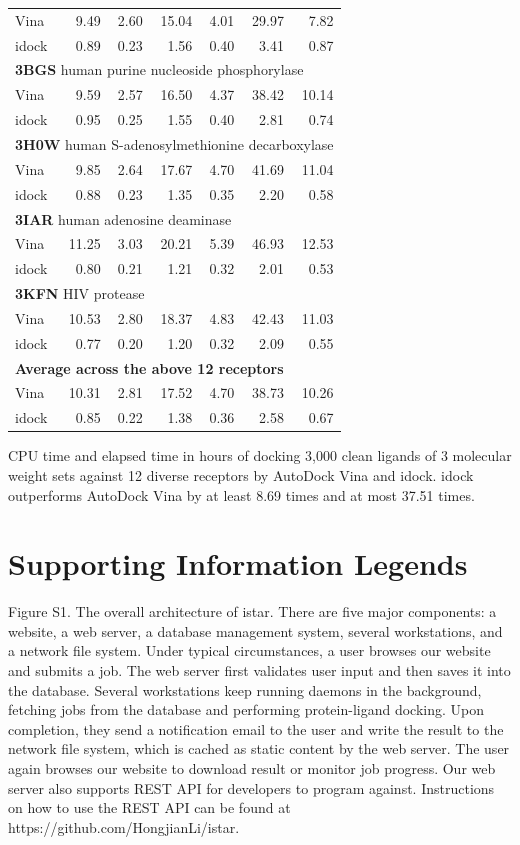 \documentclass[10pt]{article}
\begin{document}
\begin{table}[!ht]
\begin{tabular}{lrrrrrr}
Vina  &  9.49 &  2.60 & 15.04 &  4.01 & 29.97 &  7.82\\
idock &  0.89 &  0.23 &  1.56 &  0.40 &  3.41 &  0.87\\
\multicolumn{7}{l}{\textbf{3BGS} human purine nucleoside phosphorylase}\\
Vina  &  9.59 &  2.57 & 16.50 &  4.37 & 38.42 & 10.14\\
idock &  0.95 &  0.25 &  1.55 &  0.40 &  2.81 &  0.74\\
\multicolumn{7}{l}{\textbf{3H0W} human S-adenosylmethionine decarboxylase}\\
Vina  &  9.85 &  2.64 & 17.67 &  4.70 & 41.69 & 11.04\\
idock &  0.88 &  0.23 &  1.35 &  0.35 &  2.20 &  0.58\\
\multicolumn{7}{l}{\textbf{3IAR} human adenosine deaminase}\\
Vina  & 11.25 &  3.03 & 20.21 &  5.39 & 46.93 & 12.53\\
idock &  0.80 &  0.21 &  1.21 &  0.32 &  2.01 &  0.53\\
\multicolumn{7}{l}{\textbf{3KFN} HIV protease}\\
Vina  & 10.53 &  2.80 & 18.37 &  4.83 & 42.43 & 11.03\\
idock &  0.77 &  0.20 &  1.20 &  0.32 &  2.09 &  0.55\\
\multicolumn{7}{l}{\textbf{Average across the above 12 receptors}}\\
Vina  & 10.31 &  2.81 & 17.52 &  4.70 & 38.73 & 10.26\\
idock &  0.85 &  0.22 &  1.38 &  0.36 &  2.58 &  0.67\\
\end{tabular}
\begin{flushleft}\label{ExecutionTime} CPU time and elapsed time in hours of docking 3,000 clean ligands of 3 molecular weight sets against 12 diverse receptors by AutoDock Vina and idock. idock outperforms AutoDock Vina by at least 8.69 times and at most 37.51 times.
\end{flushleft}
\end{table}

\section*{Supporting Information Legends}

Figure S1. The overall architecture of istar. There are five major components: a website, a web server, a database management system, several workstations, and a network file system. Under typical circumstances, a user browses our website and submits a job. The web server first validates user input and then saves it into the database. Several workstations keep running daemons in the background, fetching jobs from the database and performing protein-ligand docking. Upon completion, they send a notification email to the user and write the result to the network file system, which is cached as static content by the web server. The user again browses our website to download result or monitor job progress. Our web server also supports REST API for developers to program against. Instructions on how to use the REST API can be found at https://github.com/HongjianLi/istar.
\end{document}
